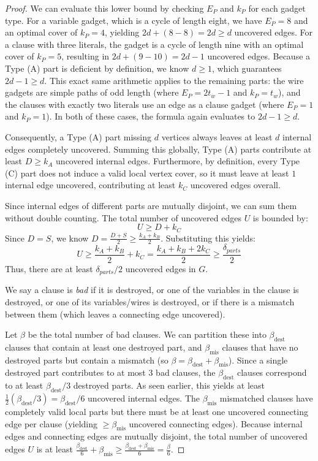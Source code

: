 \documentclass[11pt]{article}
\begin{document}
\begin{proof}
We can evaluate this lower bound by checking $E_P$ and $k_P$ for each gadget type. For a variable gadget, which is a cycle of length eight, we have $E_P = 8$ and an optimal cover of $k_P = 4$, yielding $2d + (8 - 8) = 2d \ge d$ uncovered edges. For a clause with three literals, the gadget is a cycle of length nine with an optimal cover of $k_P = 5$, resulting in $2d + (9 - 10) = 2d - 1$ uncovered edges. Because a Type (A) part is deficient by definition, we know $d \ge 1$, which guarantees $2d - 1 \ge d$. This exact same arithmetic applies to the remaining parts: the wire gadgets are simple paths of odd length (where $E_P = 2t_w - 1$ and $k_P = t_w$), and the clauses with exactly two literals use an edge as a clause gadget (where $E_P = 1$ and $k_P = 1$). In both of these cases, the formula again evaluates to $2d - 1 \ge d$. 

Consequently, a Type (A) part missing $d$ vertices always leaves at least $d$ internal edges completely uncovered. Summing this globally, Type (A) parts contribute at least $D \ge k_A$ uncovered internal edges. Furthermore, by definition, every Type (C) part does not induce a valid local vertex cover, so it must leave at least $1$ internal edge uncovered, contributing at least $k_C$ uncovered edges overall.

Since internal edges of different parts are mutually disjoint, we can sum them without double counting. The total number of uncovered edges $U$ is bounded by:
\[ U \ge D + k_C \]
Since $D = S$, we know $D = \frac{D + S}{2} \ge \frac{k_A + k_B}{2}$. Substituting this yields:
\[ U \ge \frac{k_A + k_B}{2} + k_C = \frac{k_A + k_B + 2k_C}{2} \ge \frac{\delta_{parts}}{2} \]
Thus, there are at least $\delta_{parts}/2$ uncovered edges in $G$.

We say a clause is \emph{bad} if it is destroyed, or one of the variables in the clause is destroyed, or one of its variables/wires is destroyed, or if there is a mismatch between them (which leaves a connecting edge uncovered).

Let $\beta$ be the total number of bad clauses. We can partition these into $\beta_{\text{dest}}$ clauses that contain at least one destroyed part, and $\beta_{\text{mis}}$ clauses that have no destroyed parts but contain a mismatch (so $\beta = \beta_{\text{dest}} + \beta_{\text{mis}}$). Since a single destroyed part contributes to at most 3 bad clauses, the $\beta_{\text{dest}}$ clauses correspond to at least $\beta_{\text{dest}}/3$ destroyed parts. As seen earlier, this yields at least $\frac{1}{2}(\beta_{\text{dest}}/3) = \beta_{\text{dest}}/6$ uncovered internal edges. The $\beta_{\text{mis}}$ mismatched clauses have completely valid local parts but there must be at least one uncovered connecting edge per clause (yielding $\ge \beta_{\text{mis}}$ uncovered connecting edges). Because internal edges and connecting edges are mutually disjoint, the total number of uncovered edges $U$ is at least $\frac{\beta_{\text{dest}}}{6} + \beta_{\text{mis}} \ge \frac{\beta_{\text{dest}} + \beta_{\text{mis}}}{6} = \frac{\beta}{6}$.


\end{proof}
\end{document}

